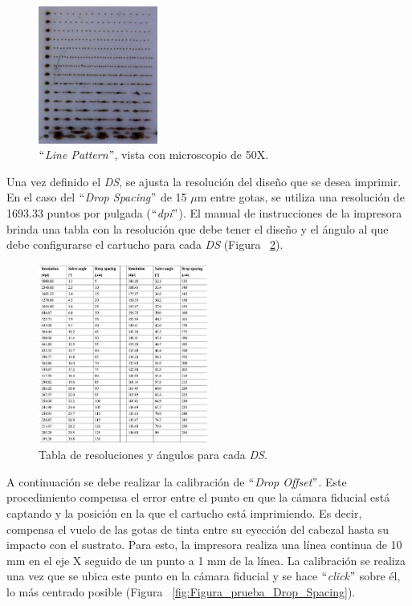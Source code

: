 \begin{figure}[H]
  \centering
    \includegraphics[width=0.35\textwidth]{Figuras/Figura_Line_Pattern_Micro50X}
  \caption{$``$\textit{Line Pattern}$"$, vista con microscopio de 50X.}
  \label{fig:Figura_Line_Pattern_Micro50X}
\end{figure}

Una vez definido el \emph{DS}, se ajusta la resolución del diseño que se desea imprimir. En el caso del $``$\textit{Drop Spacing}$"$ de 15 $\mu$m entre gotas, se utiliza una resolución de 1693.33 puntos por pulgada ($``$\textit{dpi}$"$). El manual de instrucciones de la impresora \cite{DimatixUM} brinda una tabla con la resolución que debe tener el diseño y el ángulo al que debe configurarse el cartucho para cada \emph{DS} (Figura ~\ref{fig:Figura_Tabla_angulos}).

\begin{figure}[H]
  \centering
    \includegraphics[width=0.5\textwidth]{Figuras/Figura_Tabla_angulos}
  \caption{Tabla de resoluciones y ángulos para cada \emph{DS}.}
  \label{fig:Figura_Tabla_angulos}
\end{figure}

A continuación se debe realizar la calibración de $``$\textit{Drop Offset}$"$. Este procedimiento compensa el error entre el punto en que la cámara fiducial está captando y la posición en la que el cartucho está imprimiendo. Es decir, compensa el vuelo de las gotas de tinta entre su eyección del cabezal hasta su impacto con el sustrato. Para esto, la impresora realiza una línea continua de 10 mm en el eje X seguido de un punto a 1 mm de la línea. La calibración se realiza una vez que se ubica este punto en la cámara fiducial y se hace $``$\textit{click}$"$ sobre él, lo más centrado posible (Figura ~\ref{fig:Figura_prueba_Drop_Spacing}).

